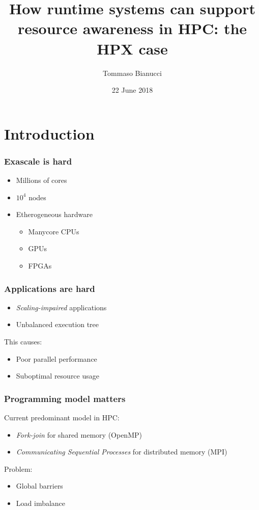 \documentclass[compress]{beamer}
\title[]{How runtime systems can support resource awareness in HPC: the HPX case}
\author{Tommaso Bianucci}
\date{22 June 2018}
\institute{Technische Universität München}
\begin{document}
\begin{frame}
\maketitle
\end{frame}

\section{Introduction}
\begin{frame}
	\frametitle{Exascale is hard}
	\begin{itemize}
		\item Millions of cores
		\item $10^4$ nodes
		\item Etherogeneous hardware
		\begin{itemize}
			\item Manycore CPUs
			\item GPUs
			\item FPGAs
		\end{itemize}
	\end{itemize}
\end{frame}

\begin{frame}
	\frametitle{Applications are hard}
	\begin{itemize}
		\item \emph{Scaling-impaired} applications
		\item Unbalanced execution tree
	\end{itemize}
	\pause
	This causes:
	\begin{itemize}
		\item Poor parallel performance
		\item Suboptimal resource usage
	\end{itemize}
\end{frame}

\begin{frame}
	\frametitle{Programming model matters}
	Current predominant model in HPC:
	\begin{itemize}
		\item \emph{Fork-join} for shared memory (OpenMP)
		\item \emph{Communicating Sequential Processes} for distributed memory (MPI)
	\end{itemize}
	\pause
	Problem:
	\begin{itemize}
		\item Global barriers
		\item Load imbalance
	\end{itemize}
\end{frame}
\end{document}
